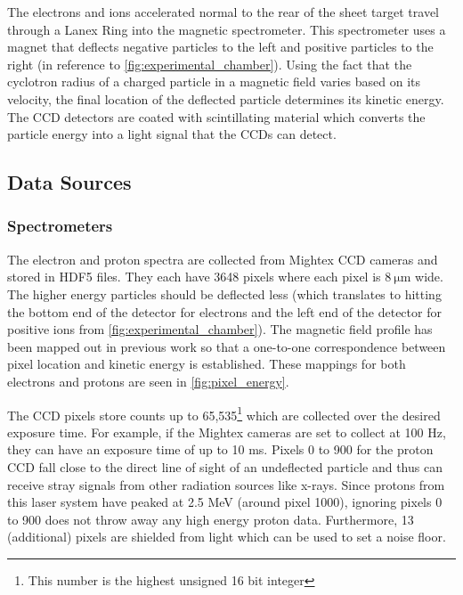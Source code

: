 The electrons and ions accelerated normal to the rear of the sheet target travel through a Lanex Ring into the magnetic spectrometer. This spectrometer uses a magnet that deflects negative particles to the left and positive particles to the right (in reference to \autoref{fig:experimental_chamber}). Using the fact that the cyclotron radius of a charged particle in a magnetic field varies based on its velocity, the final location of the deflected particle determines its kinetic energy. The \gls{CCD} detectors are coated with scintillating material which converts the particle energy into a light signal that the \gls{CCD}s can detect.  

\subsection{Data Sources} \label{sec:data_sources}
\subsubsection{Spectrometers}

The electron and proton spectra are collected from Mightex \gls{CCD} cameras and stored in \gls{HDF5} files. They each have 3648 pixels where each pixel is $\SI{8}{\micro \meter}$ wide. The higher energy particles should be deflected less (which translates to hitting the bottom end of the detector for electrons and the left end of the detector for positive ions from \autoref{fig:experimental_chamber}). The magnetic field profile has been mapped out in previous work \cite{Morrison_2018_NJoP} so that a one-to-one correspondence between pixel location and kinetic energy is established. These mappings for both electrons and protons are seen in \autoref{fig:pixel_energy}. 

The CCD pixels store counts up to 65,535\footnote{This number is the highest unsigned 16 bit integer} which are collected over the desired exposure time. For example, if the Mightex cameras are set to collect at 100 Hz, they can have an exposure time of up to 10 ms. Pixels 0 to 900 for the proton CCD fall close to the direct line of sight of an undeflected particle and thus can receive stray signals from other radiation sources like x-rays. Since protons from this laser system have peaked at 2.5 MeV \cite{Morrison_2018_NJoP} (around pixel 1000), ignoring pixels 0 to 900 does not throw away any high energy proton data. Furthermore, 13 (additional) pixels are shielded from light which can be used to set a noise floor.

